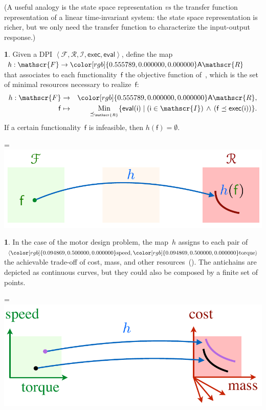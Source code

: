 \documentclass[twocolumn,english]{IEEEtran}
\theoremstyle{definition}
\newtheorem{defn}{\protect\definitionname}
\theoremstyle{plain}
\theoremstyle{definition}
\newtheorem{example}{\protect\examplename}
\theoremstyle{remark}
\theoremstyle{definition}
\theoremstyle{plain}
\theoremstyle{plain}
\newcommand{\aword}[1]{\mathsf{#1}}
\newcommand{\vmath}[1]{\aword{#1}}
\DeclareMathOperator*{\Min}{Min}
\newcommand{\posleq}{\preceq}
\newcommand{\antichains}{\vmath{A}}
\newcommand{\ftor}{{h}}
\newcommand{\funsp}{\mathscr{F}}
\newcommand{\fun}{\vmath{f}}
\newcommand{\imp}{\vmath{i}}
\newcommand{\impsp}{\mathscr{I}}
\newcommand{\exc}{\vmath{exec}}
\newcommand{\eval}{\vmath{eval}}
\newcommand{\resleq}{\posleq_{\ressp}}
\newcommand{\ressp}{\mathscr{R}}
\newcommand{\resMin}{{\Min_{\resleq}}}
\newcommand{\Aressp}{{\antichains\ressp}}
\newcommand{\colR}{\color[rgb]{0.555789,0.000000,0.000000}}
\newcommand{\colF}{\color[rgb]{0.094869,0.500000,0.000000}}
\newcommand{\R}[1]{{\colR #1}}
\newcommand{\F}[1]{{\colF #1}}
\renewcommand{\resleq}{\posleq_{\ressp}}
\newcommand*{\vcenteredhbox}[1]{\begingroup
\setbox0=\hbox{#1}\parbox{\wd0}{\box0}\endgroup}
\newcommand{\captionsideleft}[2]{
    \medskip
    \begin{minipage}{1.8cm}{
        \hfill
        \protect\captionof{figure}{#1}}\end{minipage}
    \begin{minipage}{6.6cm}
    
    \vcenteredhbox{{#2}}
    \hfill
    \end{minipage}
    \medskip
}
\renewcommand{\Aressp}{{\colR\antichains\ressp}}
\providecommand{\definitionname}{Definition}
\providecommand{\examplename}{Example}
\begin{document}
(A useful analogy is the state space representation \emph{vs} the
transfer function representation of a linear time-invariant system:
the state space representation is richer, but we only need the transfer
function to characterize the input-output response.)
\begin{defn}
\label{def:ftor}Given a DPI $\left\langle \funsp,\ressp,\impsp,\exc,\eval\right\rangle $,
define the map~$\ftor:\funsp\rightarrow\Aressp$ that associates
to each functionality~$\fun$ the objective function of~,
which is the set of minimal resources necessary to realize~$\fun$:
\begin{eqnarray*}
\ftor:\funsp & \rightarrow & \Aressp,\\
\fun & \mapsto & \resMin\{\eval(\imp)\mid\left(\imp\in\impsp\right)\,\wedge\,\left(\fun\posleq\exc(\imp)\right)\}.
\end{eqnarray*}
If a certain functionality~$\fun$ is infeasible, then $\ftor(\fun)=\emptyset$.
\end{defn}
\captionsideleft{\label{fig:setup_h-1}}{\includegraphics[scale=0.33]{gmcdp_setup_h}}

\begin{example}
In the case of the motor design problem, the map~$\ftor$ assigns
to each pair of $\left\langle \F{\text{speed}},\F{\text{torque}}\right\rangle $
the achievable trade-off of \R{cost}, \R{mass}, and other resources~().
The antichains are depicted as continuous curves, but they could also
be composed by a finite set of points.

\captionsideleft{\label{fig:motor-trade-offs}}{\includegraphics[scale=0.33]{gmcdp_motor_tradeoffs}}
\end{example}
\end{document}
